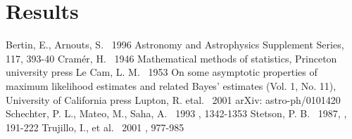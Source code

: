 \documentclass[12pt, preprint]{aastex}
\begin{document}
\section{Results}


\begin{thebibliography}{70}

 Bertin, E., Arnouts, S. \ 1996  Astronomy and Astrophysics Supplement Series, 117, 393-40
 Cram\'{e}r, H. \ 1946 Mathematical methods of statistics, Princeton university press
 Le Cam, L. M. \ 1953 On some asymptotic properties of maximum likelihood estimates and related Bayes' estimates (Vol. 1, No. 11), University of California press
 Lupton, R. etal. \ 2001  arXiv: astro-ph/0101420
 Schechter, P. L., Mateo, M., Saha, A. \ 1993 \pasp, 1342-1353
 Stetson, P. B. \ 1987, \pasp, 191-222
 Trujillo, I., et al. \ 2001 \mnras, 977-985

\end{thebibliography}
\end{document}
